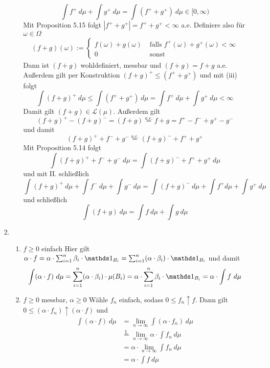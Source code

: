 \begin{enumerate}[label=(\roman*)]
\begin{enumerate}[label=\Roman*.]
        $$\int f^+\ d\mu+\int g^+\ d\mu=\int(f^++g^+)\ d\mu\in[0,\infty)$$
        Mit Proposition 5.15 folgt $|f^++g^+|=f^++g^+<\infty$ a.e. Definiere also f\"ur $\omega\in\Omega$
        \begin{align*}
            (f+g)(\omega):=
            \begin{cases}
                f(\omega)+g(\omega)&\text{ falls }f^+(\omega)+g^+(\omega)<\infty\\
                0&\text{ sonst}
            \end{cases}
        \end{align*}
        Dann ist $(f+g)$ wohldefiniert, messbar und $(f+g)=f+g$ a.e. Au\ss{}erdem gilt per Konstruktion $(f+g)^+\leq(f^++g^+)$ und mit (iii) folgt
        $$\int (f+g)^+\ d\mu\leq\int (f^++g^+)\ d\mu=\int f^+\ d\mu+\int g^+\ d\mu<\infty$$
        Damit gilt $(f+g)\in\mathcal{L}(\mu)$. Au\ss{}erdem gilt
        $$(f+g)^+-(f+g)^-=(f+g)\overset{a.e.}{=}f+g=f^+-f^-+g^+-g^-$$
        und damit 
        $$(f+g)^++f^-+g^-\overset{a.e.}{=}(f+g)^-+f^++g^+$$
        Mit Proposition 5.14 folgt 
        $$\int(f+g)^++f^-+g^-\ d\mu=\int (f+g)^-+f^++g^+\ d\mu$$
        und mit II. schlie\ss{}lich
        $$\int(f+g)^+\ d\mu+\int f^-\ d\mu+\int g^-\ d\mu=\int (f+g)^-\ d\mu+\int f^+  d\mu+\int g^+\ d\mu$$
        und schlie\ss{}lich
        $$\int (f+g)\ d\mu=\int f\ d\mu+\int g\ d\mu$$
     \end{enumerate}
     \item 
     \begin{enumerate}[label=\Roman*.]
        \item $f\geq0$ einfach\newline
        Hier gilt $\alpha\cdot f =\alpha\cdot \sum_{i=1}^n\beta_i\cdot\ind{B_i}=\sum_{i=1}^n(\alpha\cdot\beta_i)\cdot\ind{B_i}$ und damit
        $$\int (\alpha\cdot f)\ d\mu=\sum_{i=1}^n(\alpha\cdot\beta_i)\cdot\mu(B_i)=\alpha\cdot\sum_{i=1}^n\beta_i\cdot\ind{B_i}=\alpha\cdot\int f\ d\mu$$
        \item $f\geq0$ messbar, $\alpha\geq 0$\newline
        W\"ahle $f_n$ einfach, sodass $0\leq f_n\uparrow f$. Dann gilt $0\leq(\alpha\cdot f_n)\uparrow (\alpha\cdot f)$ und 
        \begin{align*}
            \int (\alpha\cdot f)\ d\mu&=\lim_{n\to\infty}\int (\alpha\cdot f_n)\ d\mu\\&\overset{\text{I.}}{=}\lim_{n\to\infty}\alpha\cdot\int f_n\ d\mu\\&=\alpha\cdot\lim_{n\to\infty}\int f_n\ d\mu\\&=\alpha\cdot\int f\ d\mu

\end{align*}
\end{enumerate}
\end{enumerate}
